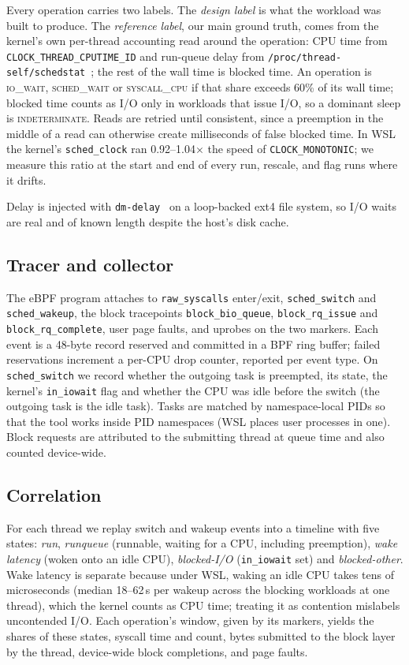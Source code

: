 \documentclass[conference]{IEEEtran}
\newcommand{\lbl}[1]{\textsc{#1}}
\newcommand{\IO}{\lbl{io\_wait}}
\newcommand{\SCHED}{\lbl{sched\_wait}}
\newcommand{\CPU}{\lbl{syscall\_cpu}}
\newcommand{\IND}{\lbl{indeterminate}}
\begin{document}
Every operation carries two labels. The \emph{design label} is what the workload was built to produce. The \emph{reference label}, our main ground truth, comes from the kernel's own per-thread accounting read around the operation: CPU time from \texttt{CLOCK\_THREAD\_CPUTIME\_ID} and run-queue delay from \texttt{/proc/thread-self/schedstat}~\cite{schedstats}; the rest of the wall time is blocked time. An operation is \IO{}, \SCHED{} or \CPU{} if that share exceeds 60\% of its wall time; blocked time counts as I/O only in workloads that issue I/O, so a dominant sleep is \IND. Reads are retried until consistent, since a preemption in the middle of a read can otherwise create milliseconds of false blocked time. In WSL the kernel's \texttt{sched\_clock} ran 0.92--1.04$\times$ the speed of \texttt{CLOCK\_MONOTONIC}; we measure this ratio at the start and end of every run, rescale, and flag runs where it drifts.

Delay is injected with \texttt{dm-delay}~\cite{dmdelay} on a loop-backed ext4 file system, so I/O waits are real and of known length despite the host's disk cache.

\subsection{Tracer and collector}
The eBPF program attaches to \texttt{raw\_syscalls} enter/exit, \texttt{sched\_switch} and \texttt{sched\_wakeup}, the block tracepoints \texttt{block\_bio\_queue}, \texttt{block\_rq\_issue} and \texttt{block\_rq\_complete}, user page faults, and uprobes on the two markers. Each event is a 48-byte record reserved and committed in a BPF ring buffer; failed reservations increment a per-CPU drop counter, reported per event type. On \texttt{sched\_switch} we record whether the outgoing task is preempted, its state, the kernel's \texttt{in\_iowait} flag and whether the CPU was idle before the switch (the outgoing task is the idle task). Tasks are matched by namespace-local PIDs so that the tool works inside PID namespaces (WSL places user processes in one). Block requests are attributed to the submitting thread at queue time and also counted device-wide.

\subsection{Correlation}
For each thread we replay switch and wakeup events into a timeline with five states: \emph{run}, \emph{runqueue} (runnable, waiting for a CPU, including preemption), \emph{wake latency} (woken onto an idle CPU), \emph{blocked-I/O} (\texttt{in\_iowait} set) and \emph{blocked-other}. Wake latency is separate because under WSL, waking an idle CPU takes tens of microseconds (median 18--62\,\textmu s per wakeup across the blocking workloads at one thread), which the kernel counts as CPU time; treating it as contention mislabels uncontended I/O. Each operation's window, given by its markers, yields the shares of these states, syscall time and count, bytes submitted to the block layer by the thread, device-wide block completions, and page faults.
\end{document}
